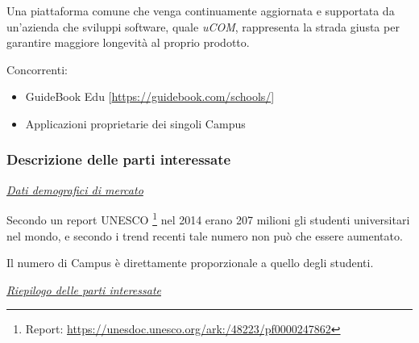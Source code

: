 Una piattaforma comune che venga continuamente aggiornata e supportata da un'azienda che sviluppi software, quale \textit{uCOM}, rappresenta la strada giusta per garantire maggiore longevità al proprio prodotto.

Concorrenti:
\begin{itemize}
	\item GuideBook Edu [\url{https://guidebook.com/schools/}]
	\item Applicazioni proprietarie dei singoli Campus
\end{itemize}

\newpage

\subsubsection{Descrizione delle parti interessate}

\underline{\textit{Dati demografici di mercato}}

Secondo un report UNESCO
\footnote{Report: \url{https://unesdoc.unesco.org/ark:/48223/pf0000247862}} 
nel 2014 erano 207 milioni gli studenti universitari nel mondo, e secondo i trend recenti tale numero non può che essere aumentato.

Il numero di Campus è direttamente proporzionale a quello degli studenti.

\underline{\textit{Riepilogo delle parti interessate}}


